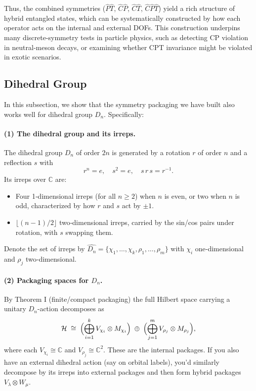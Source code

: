 \documentclass[12pt,a4paper]{article}
\begin{document}
Thus, the combined symmetries ($\hat{P}\hat{T}$, $\hat{C}\hat{P}$, $\hat{C}\hat{T}$, $\hat{C}\hat{P}\hat{T}$) yield a rich structure of hybrid entangled states, which can be systematically constructed by how each operator acts on the internal and external DOFs.
This construction underpins many discrete-symmetry tests in particle physics, such as detecting CP violation in neutral-meson decays, or examining whether CPT invariance might be violated in exotic scenarios.



\subsection{Dihedral Group}


In this subsection, we show that the symmetry packaging we have built also works well for dihedral group $D_n$.
Specifically:


\paragraph{(1) The dihedral group and its irreps.}

The dihedral group $D_n$ of order $2n$ is generated by a rotation $r$ of order $n$ and a reflection $s$ with
$$
r^n = e,\quad s^2=e,\quad s\,r\,s = r^{-1}.
$$
Its irreps over $\mathbb C$ are:
\begin{itemize}
	\item Four 1‑dimensional irreps (for all $n\ge2$) when $n$ is even, or two when $n$ is odd, characterized by how $r$ and $s$ act by $\pm1$.
	
	\item $\lfloor (n-1)/2\rfloor$ two‑dimensional irreps, carried by the sin/cos pairs under rotation, with $s$ swapping them.
\end{itemize}
Denote the set of irreps by $\widehat{D_n}=\{\chi_1,\dots,\chi_{k},\rho_1,\dots,\rho_{m}\}$ with $\chi_i$ one‑dimensional and $\rho_j$ two‑dimensional.



\paragraph{(2) Packaging spaces for $D_n$.}

By Theorem I (finite/compact packaging) the full Hilbert space carrying a unitary $D_n$-action decomposes as
$$
\mathcal H
\;\cong\;
\Bigl(\bigoplus_{i=1}^{k} V_{\chi_i}\otimes M_{\chi_i}\Bigr)
\;\oplus\;
\Bigl(\bigoplus_{j=1}^{m} V_{\rho_j}\otimes M_{\rho_j}\Bigr),
$$
where each $V_{\chi_i}\cong\mathbb C$ and $V_{\rho_j}\cong\mathbb C^2$.
These are the internal packages.
If you also have an external dihedral action (say on orbital labels), you’d similarly decompose by its irreps into external packages and then form hybrid packages $V_\lambda\otimes W_\mu$.
\end{document}
